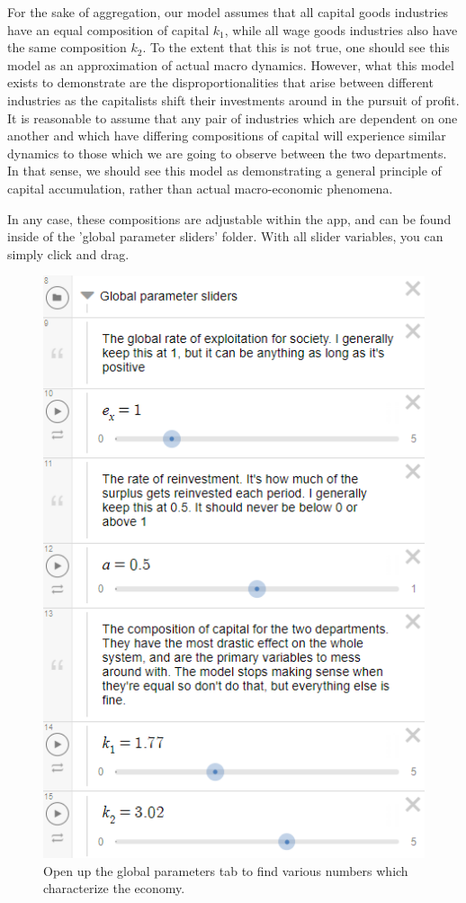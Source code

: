 \documentclass{article}
\theoremstyle{theorem}
\begin{document}
For the sake of aggregation, our model assumes that all capital goods industries have an equal composition of capital $k_1$, while all wage goods industries also have the same composition $k_2$. To the extent that this is not true, one should see this model as an approximation of actual macro dynamics. However, what this model exists to demonstrate are the disproportionalities that arise between different industries as the capitalists shift their investments around in the pursuit of profit. It is reasonable to assume that any pair of industries which are dependent on one another and which have differing compositions of capital will experience similar dynamics to those which we are going to observe between the two departments. In that sense, we should see this model as demonstrating a general principle of capital accumulation, rather than actual macro-economic phenomena. \par 
In any case, these compositions are adjustable within the app, and can be found inside of the 'global parameter sliders' folder. With all slider variables, you can simply click and drag.
\begin{figure}[H]
\centering
\includegraphics[scale=.7]{Images/globalParameters}
\caption{Open up the global parameters tab to find various numbers which characterize the economy.}
\end{figure}
\end{document}
